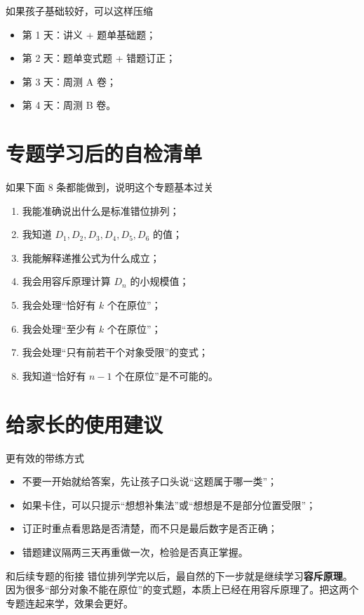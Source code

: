 \documentclass[11pt,a4paper,fontset=fandol]{ctexart}
\begin{document}
\begin{infobox}{如果孩子基础较好，可以这样压缩}
\begin{itemize}
  \item 第 1 天：讲义 + 题单基础题；
  \item 第 2 天：题单变式题 + 错题订正；
  \item 第 3 天：周测 A 卷；
  \item 第 4 天：周测 B 卷。
\end{itemize}
\end{infobox}

\section{专题学习后的自检清单}

\begin{goalbox}{如果下面 8 条都能做到，说明这个专题基本过关}
\begin{enumerate}
  \item 我能准确说出什么是标准错位排列；
  \item 我知道 $D_1,D_2,D_3,D_4,D_5,D_6$ 的值；
  \item 我能解释递推公式为什么成立；
  \item 我会用容斥原理计算 $D_n$ 的小规模值；
  \item 我会处理“恰好有 $k$ 个在原位”；
  \item 我会处理“至少有 $k$ 个在原位”；
  \item 我会处理“只有前若干个对象受限”的变式；
  \item 我知道“恰好有 $n-1$ 个在原位”是不可能的。
\end{enumerate}
\end{goalbox}

\section{给家长的使用建议}

\begin{warnbox}{更有效的带练方式}
\begin{itemize}
  \item 不要一开始就给答案，先让孩子口头说“这题属于哪一类”；
  \item 如果卡住，可以只提示“想想补集法”或“想想是不是部分位置受限”；
  \item 订正时重点看思路是否清楚，而不只是最后数字是否正确；
  \item 错题建议隔两三天再重做一次，检验是否真正掌握。
\end{itemize}
\end{warnbox}

\begin{infobox}{和后续专题的衔接}
错位排列学完以后，最自然的下一步就是继续学习\textbf{容斥原理}。因为很多“部分对象不能在原位”的变式题，本质上已经在用容斥原理了。把这两个专题连起来学，效果会更好。
\end{infobox}
\end{document}
